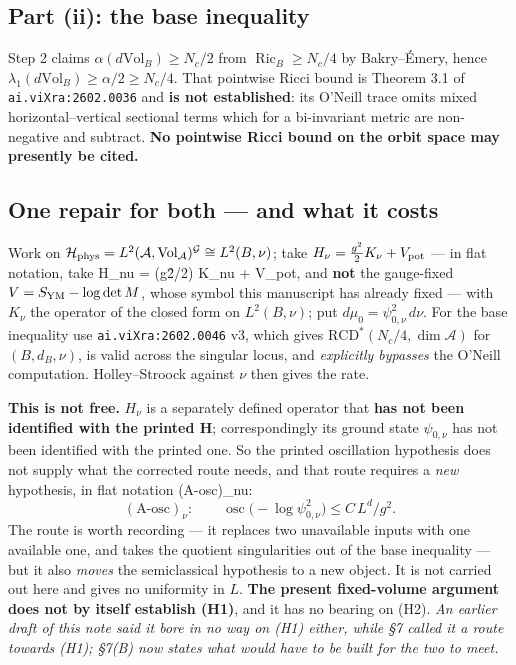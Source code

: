 \documentclass[11pt]{article}
\newcommand{\A}{\mathcal A}
\newcommand{\G}{\mathcal G}
\begin{document}
\subsection{Part (ii): the base inequality}

Step 2 claims $\alpha(d\mathrm{Vol}_B)\ge N_c/2$ from $\operatorname{Ric}_B\ge N_c/4$ by
Bakry--\'Emery, hence $\lambda_1(d\mathrm{Vol}_B)\ge\alpha/2\ge N_c/4$. That pointwise
Ricci bound is Theorem 3.1 of \texttt{ai.viXra:2602.0036} and \textbf{is not
established}: its O'Neill trace omits mixed horizontal--vertical sectional terms which
for a bi-invariant metric are non-negative and subtract. \textbf{No pointwise Ricci
bound on the orbit space may presently be cited.}

\subsection{One repair for both --- and what it costs}

Work on $\mathcal H_{\rm phys}=L^2(\A,\mathrm{Vol}_{\A})^{\G}\cong L^2(B,\nu)$; take
$H_\nu=\frac{g^2}{2}K_\nu+V_{\rm pot}$ --- in flat notation, take H\_nu = (g\^2/2)
K\_nu + V\_pot, and \textbf{not} the gauge-fixed $V=S_{\rm YM}-\log\det M$, whose symbol
this manuscript has already fixed --- with $K_\nu$ the operator of the closed form on
$L^2(B,\nu)$; put $d\mu_0=\psi_{0,\nu}^2\,d\nu$. For the base inequality use
\texttt{ai.viXra:2602.0046} v3, which gives $\mathrm{RCD}^*(N_c/4,\dim\A)$ for
$(B,d_B,\nu)$, is valid across the singular locus, and \emph{explicitly bypasses} the
O'Neill computation. Holley--Stroock against $\nu$ then gives the rate.

\textbf{This is not free.} $H_\nu$ is a separately defined operator that
\textbf{has not been identified with the printed H}; correspondingly its ground state
$\psi_{0,\nu}$ has not been identified with the printed one. So the printed oscillation
hypothesis does not supply what the corrected route needs, and that route requires a
\emph{new} hypothesis, in flat notation (A-osc)\_nu:
\[
(\text{A-osc})_\nu:\qquad \operatorname{osc}\bigl(-\log\psi_{0,\nu}^2\bigr)\le
C\,L^d/g^2 .
\]
The route is worth recording --- it replaces two unavailable inputs with one available
one, and takes the quotient singularities out of the base inequality --- but it also
\emph{moves} the semiclassical hypothesis to a new object. It is not carried out here
and gives no uniformity in $L$. \textbf{The present fixed-volume argument does not by
itself establish (H1)}, and it has no bearing on (H2). \emph{An earlier draft of this
note said it bore in no way on (H1) either, while \S7 called it a route towards (H1);
\S7(B) now states what would have to be built for the two to meet.}
\end{document}
